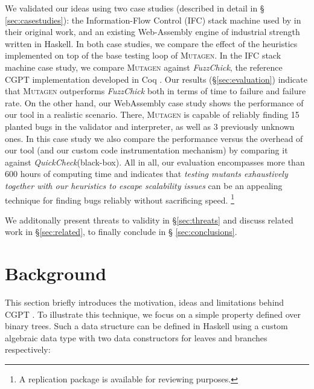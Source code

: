 \documentclass[sigconf,review,anonymous]{acmart}
\newcommand{\quickcheck}{\textit{QuickCheck}\xspace}
\newcommand{\fuzzchick}{\textit{FuzzChick}\xspace}
\newcommand{\mutagen}{\textsc{Mutagen}\xspace}
\begin{document}
We validated our ideas using two case studies (described in detail in \S
\ref{sec:casestudies}): the Information-Flow Control (IFC) stack machine used by
\citeauthor{lampropoulos2019coverage} in their original work, and an existing
{Web-Assembly} engine of industrial strength written in Haskell.
%
In both case studies, we compare the effect of the heuristics implemented on top
of the base testing loop of \mutagen.
%
In the IFC stack machine case study, we compare \mutagen against \fuzzchick, the
reference CGPT implementation developed in Coq \cite{lampropoulos2019coverage}.
%
Our results (\S \ref{sec:evaluation}) indicate that \mutagen outperforms
\fuzzchick both in terms of time to failure and failure rate.
%
On the other hand, our WebAssembly case study shows the performance of our tool
in a realistic scenario.
%
There, \mutagen is capable of reliably finding 15 planted bugs in the validator
and interpreter, as well as 3 previously unknown ones.
%
In this case study we also compare the performance versus the overhead of our
tool (and our custom code instrumentation mechanism) by comparing it against
\quickcheck (black-box).  
%
All in all, our evaluation encompasses more than 600 hours of computing time and
indicates that \emph{testing mutants exhaustively together with our heuristics
to escape scalability issues} can be an appealing technique for finding bugs
reliably without sacrificing speed.%
%
\footnote{A replication package \cite{anon_2021} is available for reviewing
  purposes.}

We additonally present threats to validity in \S \ref{sec:threats} and discuss
related work in \S \ref{sec:related}, to finally conclude in \S
\ref{sec:conclusions}.



\section{Background}
\label{sec:background}

This section briefly introduces the motivation, ideas and limitations behind
CGPT \cite{lampropoulos2019coverage}.
%
To illustrate this technique, we focus on a simple property defined over binary
trees.
%
Such a data structure can be defined in Haskell using a custom algebraic data
type with two data constructors for leaves and branches respectively:
\end{document}
